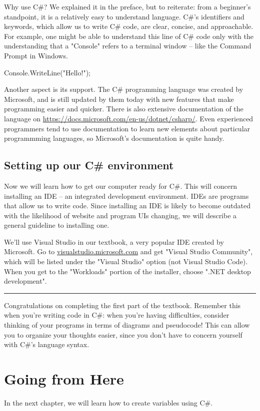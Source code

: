 \documentclass[oneside, openany] {book}
\begin{document}
Why use C\#? We explained it in the preface, but to reiterate: from a beginner's standpoint, it is a relatively easy to understand language. C\#'s identifiers and keywords, which allow us to write C\# code, are clear, concise, and approachable. For example, one might be able to understand this line of C\# code only with the understanding that a "Console" refers to a terminal window -- like the Command Prompt in Windows.

\begin{CSharp}
Console.WriteLine("Hello!");
\end{CSharp}

Another aspect is its support. The C\# programming language was created by Microsoft, and is still updated by them today with new features that make programming easier and quicker. There is also extensive documentation of the language on \url{https://docs.microsoft.com/en-us/dotnet/csharp/}. Even experienced programmers tend to use documentation to learn new elements about particular programmming languages, so Microsoft's documentation is quite handy.  
\subsection{Setting up our C\# environment}
Now we will learn how to get our computer ready for C\#. This will concern installing an IDE -- an integrated development environment. IDEs are programs that allow us to write code. Since installing an IDE is likely to become outdated with the likelihood of website and program UIs changing, we will describe a general guideline to installing one.

We'll use Visual Studio in our textbook, a very popular IDE created by Microsoft. Go to \url{visualstudio.microsoft.com} and get "Visual Studio Community", which will be listed under the "Visual Studio" option (not Visual Studio Code). When you get to the "Workloads" portion of the installer, choose ".NET desktop development".

\rule{\textwidth}{0.4pt}
Congratulations on completing the first part of the textbook. Remember this when you're writing code in C\#: when you're having difficulties, consider thinking of your programs in terms of diagrams and pseudocode! This can allow you to organize your thoughts easier, since you don't have to concern yourself with C\#'s language syntax.
\section*{Going from Here}
In the next chapter, we will learn how to create variables using C\#.
\end{document}
